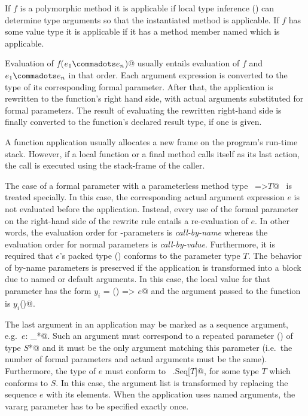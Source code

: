 If $f$ is a polymorphic method it is applicable if local type
inference () can
determine type arguments so that the instantiated method is applicable. If
$f$ has some value type it is applicable if it has a method member named
 which is applicable.



Evaluation of \lstinline@$f$($e_1 \commadots e_n$)@ usually entails evaluation of
$f$ and $e_1 \commadots e_n$ in that order. Each argument expression
is converted to the type of its corresponding formal parameter.  After
that, the application is rewritten to the function's right hand side,
with actual arguments substituted for formal parameters.  The result
of evaluating the rewritten right-hand side is finally converted to
the function's declared result type, if one is given.

A function application usually allocates a new frame on the program's
run-time stack. However, if a local function or a final method calls
itself as its last action, the call is executed using the stack-frame
of the caller.

The case of a formal parameter with a parameterless
method type ~\lstinline@=>$T$@~ is treated specially. In this case, the
corresponding actual argument expression $e$ is not evaluated before the
application. Instead, every use of the formal parameter on the
right-hand side of the rewrite rule entails a re-evaluation of $e$. 
In other words, the evaluation order for
\code{=>}-parameters is {\em call-by-name} whereas the evaluation
order for normal parameters is {\em call-by-value}.
Furthermore, it is required that $e$'s packed type ()
conforms to the parameter type $T$.
The behavior of by-name parameters is preserved if the application is
transformed into a block due to named or default arguments. In this case,
the local value for that parameter has the form \lstinline@val $y_i$ = () => $e$@
and the argument passed to the function is \lstinline@$y_i$()@.

The last argument in an application may be marked as a sequence
argument, e.g.\ \lstinline@$e$: _*@. Such an argument must correspond
to a repeated parameter () of type
\lstinline@$S$*@ and it must be the only argument matching this
parameter (i.e.\ the number of formal parameters and actual arguments
must be the same). Furthermore, the type of $e$ must conform to
~\lstinline@scala.Seq[$T$]@, for some type $T$ which conforms to
$S$. In this case, the argument list is transformed by replacing the
sequence $e$ with its elements. When the application uses named
arguments, the vararg parameter has to be specified exactly once.

